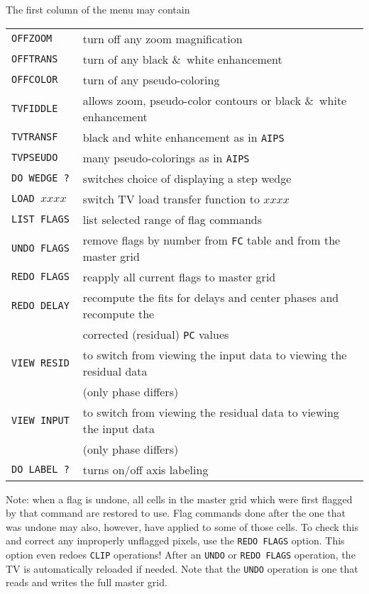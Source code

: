 \documentclass[twoside]{article}
\begin{document}
The first column of the menu may contain
\begin{center}
\begin{tabular}{|l|l|}\hline
{\tt OFFZOOM    } &   turn off any zoom magnification \\
{\tt OFFTRANS   } &   turn of any black \&\ white enhancement\\
{\tt OFFCOLOR   } &   turn of any pseudo-coloring\\
{\tt TVFIDDLE   } &   allows zoom, pseudo-color contours or black
                      \&\ white enhancement\\
{\tt TVTRANSF   } &   black and white enhancement as in {\tt AIPS}\\
{\tt TVPSEUDO   } &   many pseudo-colorings as in {\tt AIPS}\\
{\tt DO WEDGE ? } &   switches choice of displaying a step wedge\\
{\tt LOAD $xxxx$ } &  switch TV load transfer function to $xxxx$\\
{\tt LIST FLAGS } &   list selected range of flag commands\\
{\tt UNDO FLAGS } &   remove flags by number from {\tt FC} table and
                      from the master grid\\
{\tt REDO FLAGS } &   reapply all current flags to master grid\\
{\tt REDO DELAY } &   recompute the fits for delays and center phases and
                      recompute the\\
                  &   corrected (residual) {\tt PC} values\\
{\tt VIEW RESID } &   to switch from viewing the input data to viewing the
                      residual data\\
                  &   (only phase differs)\\
{\tt VIEW INPUT } &   to switch from viewing the residual data to viewing
                      the input data\\
                  &   (only phase differs)\\
{\tt DO LABEL ? } &   turns on/off axis labeling
\\ \hline
\end{tabular}
\end{center}
Note: when a flag is undone, all cells in the master grid which were
first flagged by that command are restored to use.  Flag commands done
after the one that was undone may also, however, have applied to some of
those cells.  To check this and correct any improperly unflagged pixels,
use the {\tt REDO FLAGS} option. This option even redoes {\tt CLIP}
operations!  After an {\tt UNDO} or {\tt REDO FLAGS} operation, the TV
is automatically reloaded if needed. Note that the {\tt UNDO}
operation is one that reads and writes the full master grid.
\end{document}

